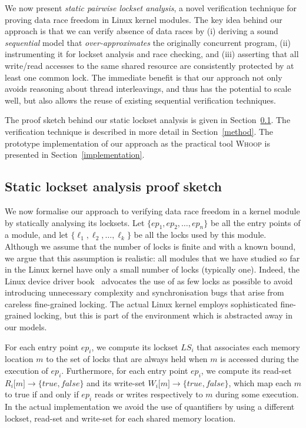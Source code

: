We now present \emph{static pairwise lockset analysis}, a novel verification technique for proving data race freedom in Linux kernel modules. The key idea behind our approach is that we can verify absence of data races by (i) deriving a sound \emph{sequential} model that \emph{over-approximates} the originally concurrent program, (ii) instrumenting it for lockset analysis and race checking, and (iii) asserting that all write/read accesses to the same shared resource are consistently protected by at least one common lock. The immediate benefit is that our approach not only avoids reasoning about thread interleavings, and thus has the potential to scale well, but also allows the reuse of existing sequential verification techniques.

The proof sketch behind our static lockset analysis is given in Section~\ref{proof}. The verification technique is described in more detail in Section~\ref{method}. The prototype implementation of our approach as the practical tool \textsc{Whoop} is presented in Section~\ref{implementation}.

\subsection{Static lockset analysis proof sketch}
\label{proof}

We now formalise our approach to verifying data race freedom in a kernel module by statically analysing its locksets. Let $\{\mathit{ep}_{1}, \mathit{ep}_{2}, \dotsc, \mathit{ep}_{n}\}$ be all the entry points of a module, and let $\{\ell_{1}, \ell_{2}, \dotsc, \ell_{k}\}$ be all the locks used by this module. Although we assume that the number of locks is finite and with a known bound, we argue that this assumption is realistic: all modules that we have studied so far in the Linux kernel have only a small number of locks (typically one). Indeed, the Linux device driver book~\cite{corbet2005linux} advocates the use of as few locks as possible to avoid introducing unnecessary complexity and synchronisation bugs that arise from careless fine-grained locking. The actual Linux kernel employs sophisticated fine-grained locking, but this is part of the environment which is abstracted away in our models.

For each entry point $\mathit{ep}_{i}$, we compute its lockset $\mathit{LS}_{i}$ that associates each memory location $m$ to the set of locks that are always held when $m$ is accessed during the execution of $\mathit{ep}_{i}$. Furthermore, for each entry point $\mathit{ep}_{i}$, we compute its read-set $R_{i}\lbrack m\rbrack \rightarrow \{true, false\}$ and its write-set $W_{i}\lbrack m\rbrack \rightarrow \{true, false\}$, which map each $m$ to true if and only if $\mathit{ep}_{i}$ reads or writes respectively to $m$ during some execution. In the actual implementation we avoid the use of quantifiers by using a different lockset, read-set and write-set for each shared memory location. 


